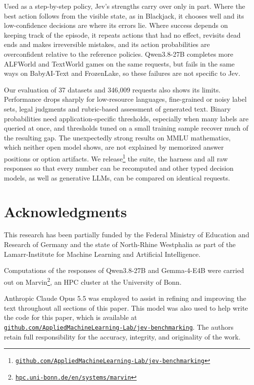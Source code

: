\documentclass[table]{article}
\begin{document}
Used as a step-by-step policy, Jev's strengths carry over only in part. Where the best action follows from the visible state, as in Blackjack, it chooses well and its low-confidence decisions are where its errors lie. Where success depends on keeping track of the episode, it repeats actions that had no effect, revisits dead ends and makes irreversible mistakes, and its action probabilities are overconfident relative to the reference policies. Qwen3.8-27B completes more ALFWorld and TextWorld games on the same requests, but fails in the same ways on BabyAI-Text and FrozenLake, so these failures are not specific to Jev.

Our evaluation of 37 datasets and 346{,}009 requests also shows its limits. Performance drops sharply for low-resource languages, fine-grained or noisy label sets, legal judgments and rubric-based assessment of generated text. Binary probabilities need application-specific thresholds, especially when many labels are queried at once, and thresholds tuned on a small training sample recover much of the resulting gap. The unexpectedly strong results on MMLU mathematics, which neither open model shows, are not explained by memorized answer positions or option artifacts. We release\footnote{\texttt{\href{https://github.com/AppliedMachineLearning-Lab/jev-benchmarking}{github.com/AppliedMachineLearning-Lab/jev-benchmarking}}} the suite, the harness and all raw responses so that every number can be recomputed and other typed decision models, as well as generative LLMs, can be compared on identical requests.

\section*{Acknowledgments}

This research has been partially funded by the Federal Ministry of Education and Research of Germany and the state of North-Rhine Westphalia as part of the Lamarr-Institute for Machine Learning and Artificial Intelligence.

Computations of the responses of Qwen3.8-27B and Gemma-4-E4B were carried out on Marvin\footnote{\texttt{\href{https://www.hpc.uni-bonn.de/en/systems/marvin}{hpc.uni-bonn.de/en/systems/marvin}}}, an HPC cluster at the University of Bonn.

Anthropic Claude Opus 5.5 \cite{anthropic2026opus55} was employed to assist in refining and improving the text throughout all sections of this paper. This model was also used to help write the code for this paper, which is available at \texttt{\href{https://github.com/AppliedMachineLearning-Lab/jev-benchmarking}{github.com/AppliedMachineLearning-Lab/jev-benchmarking}}. The authors retain full responsibility for the accuracy, integrity, and originality of the work.
\end{document}
